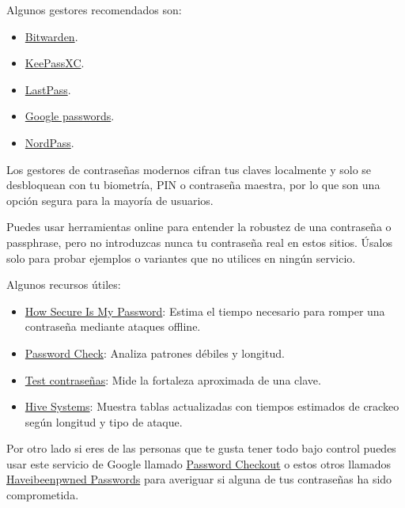 \documentclass[
  spanish,
  a4paper,
  openany]{book}
\begin{document}
Algunos gestores recomendados son:

\begin{itemize}
\item
  \href{https://bitwarden.com/}{Bitwarden}.
\item
  \href{https://keepassxc.org/}{KeePassXC}.
\item
  \href{https://www.lastpass.com/es/}{LastPass}.
\item
  \href{https://passwords.google.com/}{Google passwords}.
\item
  \href{https://nordpass.com/homepage/}{NordPass}.
\end{itemize}

Los gestores de contraseñas modernos cifran tus claves localmente y solo se desbloquean con tu biometría, PIN o contraseña maestra, por lo que son una opción segura para la mayoría de usuarios.

Puedes usar herramientas online para entender la robustez de una contraseña o passphrase, pero no introduzcas nunca tu contraseña real en estos sitios. Úsalos solo para probar ejemplos o variantes que no utilices en ningún servicio.

Algunos recursos útiles:

\begin{itemize}
\item
  \href{https://www.security.org/how-secure-is-my-password/}{How Secure Is My Password}: Estima el tiempo necesario para romper una contraseña mediante ataques offline.
\item
  \href{https://password.kaspersky.com/}{Password Check}: Analiza patrones débiles y longitud.
\item
  \href{https://www.ontek.net/test-contrasenas/}{Test contraseñas}: Mide la fortaleza aproximada de una clave.
\item
  \href{https://www.hivesystems.io/blog/are-your-passwords-in-the-green}{Hive Systems}: Muestra tablas actualizadas con tiempos estimados de crackeo según longitud y tipo de ataque.
\end{itemize}

Por otro lado si eres de las personas que te gusta tener todo bajo control puedes usar este servicio de Google llamado \href{https://www.blog.google/technology/safety-security/google-password-checkup-cross-account-protection/}{Password Checkout} o estos otros llamados \href{https://haveibeenpwned.com/Passwords}{Haveibeenpwned Passwords} para averiguar si alguna de tus contraseñas ha sido comprometida.
\end{document}
